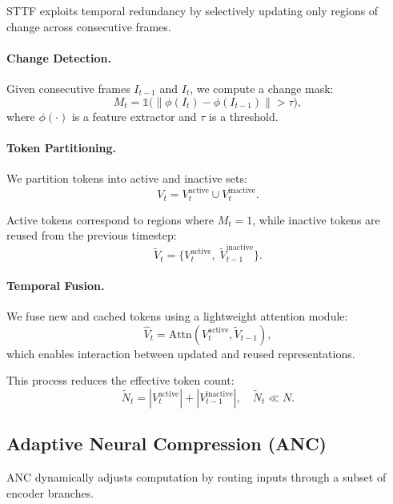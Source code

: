 \documentclass{article}
\begin{document}
STTF exploits temporal redundancy by selectively updating only regions of change across consecutive frames.

\paragraph{Change Detection.}
Given consecutive frames $I_{t-1}$ and $I_t$, we compute a change mask:
\begin{equation}
M_t = \mathbb{1}\big( \| \phi(I_t) - \phi(I_{t-1}) \| > \tau \big),
\end{equation}
where $\phi(\cdot)$ is a feature extractor and $\tau$ is a threshold.

\paragraph{Token Partitioning.}
We partition tokens into active and inactive sets:
\begin{equation}
V_t = V_t^{\text{active}} \cup V_t^{\text{inactive}}.
\end{equation}

Active tokens correspond to regions where $M_t = 1$, while inactive tokens are reused from the previous timestep:
\begin{equation}
\tilde{V}_t = \{ V_t^{\text{active}}, \; \tilde{V}_{t-1}^{\text{inactive}} \}.
\end{equation}

\paragraph{Temporal Fusion.}
We fuse new and cached tokens using a lightweight attention module:
\begin{equation}
\hat{V}_t = \text{Attn}(V_t^{\text{active}}, \tilde{V}_{t-1}),
\end{equation}
which enables interaction between updated and reused representations.

This process reduces the effective token count:
\begin{equation}
\tilde{N}_t = |V_t^{\text{active}}| + |V_{t-1}^{\text{inactive}}|, \quad \tilde{N}_t \ll N.
\end{equation}

\subsection{Adaptive Neural Compression (ANC)}

ANC dynamically adjusts computation by routing inputs through a subset of encoder branches.
\end{document}

